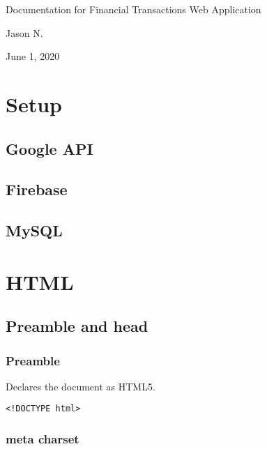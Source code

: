 \documentclass[letterpaper]{article}
\begin{document}
\vspace*{\fill}
\begin{center}
    \Large
    Documentation for Financial Transactions Web Application

    \large
    Jason N.

    June 1, 2020
\end{center}
\vspace*{\fill}

\newpage
{}
\tableofcontents

\newpage
{}
\parskip 10pt

\section{Setup}

\subsection{Google API}
\subsection{Firebase}
\subsection{MySQL}

\newpage

\section{HTML}\label{HTML}

\subsection{Preamble and head}

\subsubsection{Preamble}

Declares the document as HTML5.
\begin{lstlisting}[firstnumber=1]
<!DOCTYPE html>
\end{lstlisting}

\subsubsection{meta charset}
\end{document}
